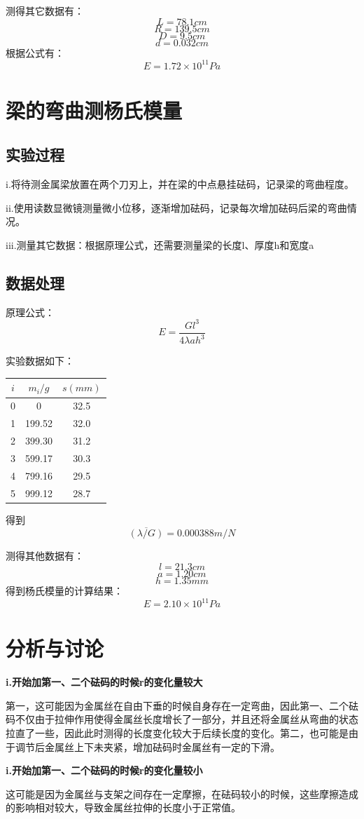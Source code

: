 \documentclass[a4paper, 10pt]{article}
\begin{document}
\noindent 测得其它数据有：
$$L=78.1cm$$
$$R=139.5cm$$
$$D=9.5cm$$
$$d=0.032cm$$
根据公式有：
$$E=1.72\times 10^{11}Pa$$
\section{梁的弯曲测杨氏模量}
\subsection{实验过程}
\noindent i.将待测金属梁放置在两个刀刃上，并在梁的中点悬挂砝码，记录梁的弯曲程度。

\vspace{10pt}
\noindent ii.使用读数显微镜测量微小位移，逐渐增加砝码，记录每次增加砝码后梁的弯曲情况‌。

\vspace{10pt}
\noindent iii.测量其它数据：根据原理公式，还需要测量梁的长度l、厚度h和宽度a
 \subsection{数据处理}

\noindent 原理公式：
 $$E=\frac{Gl^3}{4\lambda a h^3}$$

\noindent 实验数据如下：
\begin{center}
    \begin{tabular}{|c|c|c|}
      \hline
      $i $& $m_i/g$ & $s(mm)$ \\
      \hline
      0 &0 &32.5\\
      \hline
      1 & 199.52&32.0\\
      \hline
      2 &399.30 &31.2\\
      \hline
      3 & 599.17&30.3\\
      \hline
      4 &799.16 &29.5\\
      \hline
      5 &999.12 &28.7\\
      \hline
      
      
    \end{tabular}
  \end{center}

  \noindent 得到
  $$\overline{(\lambda/G)}=0.000388m/N$$

\noindent 测得其他数据有：
$$l=21.3cm$$
$$a=1.20cm$$
$$h=1.35mm$$
\noindent 得到杨氏模量的计算结果：
$$E=2.10\times 10^{11}Pa$$

\section{分析与讨论}
\noindent \textbf{i.开始加第一、二个砝码的时候r的变化量较大}

\noindent 第一，这可能因为金属丝在自由下垂的时候自身存在一定弯曲，因此第一、二个砝码不仅由于拉伸作用使得金属丝长度增长了一部分，并且还将金属丝从弯曲的状态拉直了一些，因此此时测得的长度变化较大于后续长度的变化。第二，也可能是由于调节后金属丝上下未夹紧，增加砝码时金属丝有一定的下滑。

\vspace{10pt}

\noindent \textbf{i.开始加第一、二个砝码的时候r的变化量较小}


\noindent 这可能是因为金属丝与支架之间存在一定摩擦，在砝码较小的时候，这些摩擦造成的影响相对较大，导致金属丝拉伸的长度小于正常值。
\end{document}
